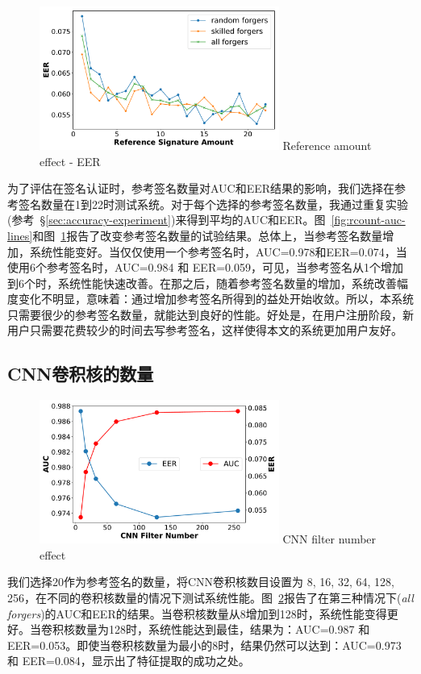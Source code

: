 \begin{figure}
  \centering
  \includegraphics[width=0.7\textwidth]{figure/rcount-eer-lines.pdf}
      {Reference amount effect - EER}
  \label{fig:rcount-eer-lines}
\end{figure}

为了评估在签名认证时，参考签名数量对AUC和EER结果的影响，我们选择在参考签名数量在1到22时测试系统。对于每个选择的参考签名数量，我通过重复实验(参考~\S\ref{sec:accuracy-experiment})来得到平均的AUC和EER。图~\ref{fig:rcount-auc-lines}和图~\ref{fig:rcount-eer-lines}报告了改变参考签名数量的试验结果。总体上，当参考签名数量增加，系统性能变好。当仅仅使用一个参考签名时，AUC=0.978和EER=0.074，当使用6个参考签名时，AUC=0.984 和 EER=0.059，可见，当参考签名从1个增加到6个时，系统性能快速改善。在那之后，随着参考签名数量的增加，系统改善幅度变化不明显，意味着：通过增加参考签名所得到的益处开始收敛。所以，本系统只需要很少的参考签名数量，就能达到良好的性能。好处是，在用户注册阶段，新用户只需要花费较少的时间去写参考签名，这样使得本文的系统更加用户友好。


\subsection{CNN卷积核的数量}
\begin{figure}
  \centering
  \includegraphics[width=0.7\textwidth]{figure/filter_number_auc_eer.pdf}
      {CNN filter number effect }
  \label{fig:filter-number-effect}
\end{figure}
我们选择20作为参考签名的数量，将CNN卷积核数目设置为 8, 16, 32, 64, 128, 256，在不同的卷积核数量的情况下测试系统性能。图~\ref{fig:filter-number-effect}报告了在第三种情况下(\textit{all forgers})的AUC和EER的结果。当卷积核数量从8增加到128时，系统性能变得更好。当卷积核数量为128时，系统性能达到最佳，结果为：AUC=0.987 和 EER=0.053。即使当卷积核数量为最小的8时，结果仍然可以达到：AUC=0.973 和 EER=0.084，显示出了特征提取的成功之处。 

